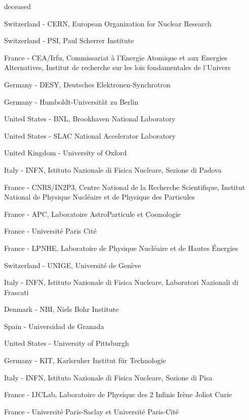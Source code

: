 \item[${}^\dag$] deceased 
\item[$^{1}$] Switzerland - CERN, European Organization for Nuclear Research
\item[$^{2}$] Switzerland - PSI, Paul Scherrer Institute
\item[$^{3}$] France - CEA/Irfu, Commissariat {\`a} l'Energie Atomique et aux Energies Alternatives, Institut de recherche sur les lois fondamentales de l'Univers
\item[$^{4}$] Germany - DESY, Deutsches Elektronen-Synchrotron 
\item[$^{5}$] Germany - Humboldt-Universit\"at zu Berlin
\item[$^{6}$] United States - BNL, Brookhaven National Laboratory
\item[$^{7}$] United States - SLAC National Accelerator Laboratory
\item[$^{8}$] United Kingdom - University of Oxford
\item[$^{9}$] Italy - INFN, Istituto Nazionale di Fisica Nucleare, Sezione di Padova
\item[$^{10}$] France - CNRS/IN2P3, Centre National de la Recherche Scientifique, Institut National de Physique Nucl{\'e}aire et de Physique des Particules
\item[$^{11}$] France - APC, Laboratoire AstroParticule et Cosmologie
\item[$^{12}$] France - Universit{\'e} Paris Cit{\'e}
\item[$^{13}$] France - LPNHE, Laboratoire de Physique Nucl{\'e}aire et de Hautes {\'E}nergies
\item[$^{14}$] Switzerland - UNIGE, Universit{\'e} de Gen{\`e}ve
\item[$^{15}$] Italy - INFN, Istituto Nazionale di Fisica Nucleare, Laboratori Nazionali di Frascati
\item[$^{16}$] Denmark - NBI, Niels Bohr Institute
\item[$^{17}$] Spain - Universidad de Granada
\item[$^{18}$] United States - University of Pittsburgh
\item[$^{19}$] Germany - KIT, Karlsruher Institut f{\"u}r Technologie
\item[$^{20}$] Italy - INFN, Istituto Nazionale di Fisica Nucleare, Sezione di Pisa
\item[$^{21}$] France - IJCLab, Laboratoire de Physique des 2 Infinis Ir{\`e}ne Joliot Curie
\item[$^{22}$] France - Universit{\'e} Paris-Saclay et Universit{\'e} Paris-Cit{\'e}

